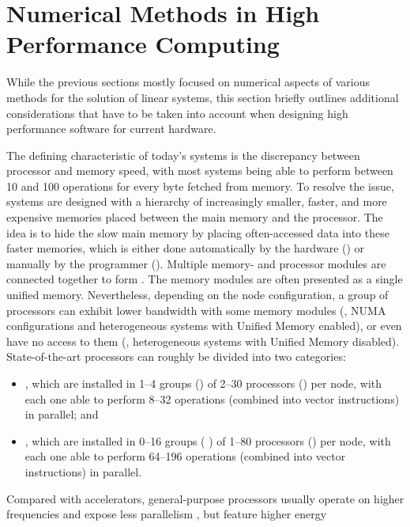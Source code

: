 \section{Numerical Methods in High Performance Computing}

While the previous sections mostly focused on numerical aspects of various
methods for the solution of linear systems, this section briefly outlines
additional considerations that have to be taken into account when designing high
performance software for current hardware.

The defining characteristic of today's systems is the discrepancy between
processor and memory speed, with most systems being able to perform between 10
and 100 operations for every byte fetched from memory. To resolve the issue,
systems are designed with a hierarchy of increasingly smaller, faster, and more
expensive memories placed between the main memory and the processor. The idea is
to hide the slow main memory by placing often-accessed data into these faster
memories, which is either done automatically by the hardware () or
manually by the programmer (). Multiple memory- and
processor modules are connected together to form . The memory
modules are often presented as a single unified memory. Nevertheless, depending
on the node configuration, a group of processors can exhibit lower
bandwidth with some memory modules (\eg, NUMA configurations and
heterogeneous systems with Unified Memory enabled), or even have no access
to them (\eg, heterogeneous systems with Unified Memory disabled).
State-of-the-art processors can roughly be divided into two categories:
\begin{itemize}
\item {}, which are installed in 1--4 groups
(\ie {}) of 2--30 processors (\ie {}) per node, with
each one able to perform 8--32 operations (combined into vector instructions) in
parallel; and
\item {}, which are installed in 0--16 groups (\eg
{}) of 1--80 processors (\eg {})
per node, with each one able to perform 64--196 operations (combined into vector
instructions) in parallel.
\end{itemize}
Compared with accelerators, general-purpose processors usually operate on higher
frequencies and expose less parallelism  , but feature higher energy
